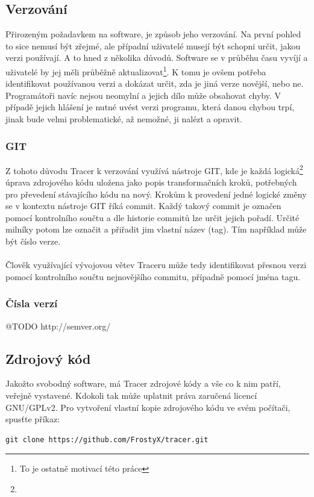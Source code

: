 \documentclass[10pt,a4paper]{article}
\begin{document}
		\subsection{Verzování}
		Přirozeným požadavkem na software, je  způsob jeho verzování. Na první pohled to sice nemusí být zřejmé, ale případní uživatelé musejí být schopni určit, jakou verzi používají. A to hned z několika důvodů. Software se v průběhu času vyvíjí a uživatelé by jej měli průběžně aktualizovat\footnote{To je ostatně motivací této práce}. K tomu je ovšem potřeba identifikovat používanou verzi a dokázat určit, zda je jiná verze novější, nebo ne. Programátoři navíc nejsou neomylní a jejich dílo může obsahovat chyby. V případě jejich hlášení je nutné uvést verzi programu, která danou chybou trpí, jinak bude velmi problematické, až nemožné, ji nalézt a opravit.

			\subsubsection{GIT}
			Z tohoto důvodu Tracer k verzování využívá nástroje GIT, kde je každá logická\footnote{} úprava zdrojového kódu uložena jako popis transformačních kroků, potřebných pro převedení stávajícího kódu na nový. Krokům k provedení jedné logické změny se v kontextu nástroje GIT říká commit. Každý takový commit je označen pomocí kontrolního součtu a dle historie commitů lze určit jejich pořadí. Určité milníky potom lze označit a přiřadit jim vlastní název (tag). Tím například může být číslo verze.
			\\
			\\
			Člověk využívající vývojovou větev Traceru může tedy identifikovat přesnou verzi pomocí kontrolního součtu nejnovějšího commitu, případně pomocí jména tagu.

			\subsubsection{Čísla verzí}
			@TODO http://semver.org/

		\subsection{Zdrojový kód}
		Jakožto svobodný software, má Tracer zdrojové kódy a vše co k nim patří, veřejně vystavené. Kdokoli tak může uplatnit práva zaručená licencí GNU/GPLv2. Pro vytvoření vlastní kopie zdrojového kódu ve svém počítači, spusťte příkaz:

		\begin{lstlisting}[gobble=12]
			git clone https://github.com/FrostyX/tracer.git
		\end{lstlisting}
\end{document}
